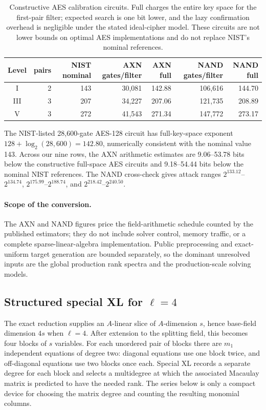 \documentclass[11pt]{article}
\newcommand{\LoneNANDRange}{$2^{133.12}$--$2^{134.74}$}
\newcommand{\LthreeNANDRange}{$2^{175.99}$--$2^{188.74}$}
\newcommand{\LfiveNANDRange}{$2^{218.42}$--$2^{240.50}$}
\newcommand{\AXNNominalHeadroomRange}{9.18--54.44}
\newcommand{\AXNFullAESGapRange}{9.06--53.78}
\begin{document}
\begin{table}[tbp]
\centering
\caption{Constructive AES calibration circuits.  Full charges the entire key
space for the first-pair filter; expected search is one bit lower, and the
lazy confirmation overhead is negligible under the stated ideal-cipher model.
These circuits are not lower bounds on optimal AES implementations and do not
replace NIST's nominal references.}
\label{tab:aes-calibration}
\scriptsize
\setlength{\tabcolsep}{3.5pt}
\begin{tabular}{@{}c r r r r r r@{}}
\toprule
Level & pairs & NIST nominal & AXN gates/filter & AXN full & NAND gates/filter & NAND full\\
\midrule
I   & 2 & 143 & 30,081 & 142.88 & 106,616 & 144.70\\
III & 3 & 207 & 34,227 & 207.06 & 121,735 & 208.89\\
V   & 3 & 272 & 41,543 & 271.34 & 147,772 & 273.17\\
\bottomrule
\end{tabular}
\end{table}

The NIST-listed 28,600-gate AES-128 circuit has full-key-space exponent
$128+\log_2(28{,}600)=142.80$, numerically consistent with the nominal value
143.  Across our nine rows, the AXN arithmetic estimates are
\AXNFullAESGapRange{} bits below the constructive full-space AES circuits and
\AXNNominalHeadroomRange{} bits below the nominal NIST references.  The NAND
cross-check gives attack ranges \LoneNANDRange, \LthreeNANDRange, and
\LfiveNANDRange.

\paragraph{Scope of the conversion.}
The AXN and NAND figures price the field-arithmetic schedule counted by the
published estimators; they do not include solver control, memory traffic, or a
complete sparse-linear-algebra implementation.  Public preprocessing and
exact-uniform target generation are bounded separately, so the dominant
unresolved inputs are the global production rank spectra and the
production-scale solving models.

\subsection{Structured special XL for \texorpdfstring{$\ell=4$}{l=4}}\label{sec:special-xl}

The exact reduction supplies an $A$-linear slice of $A$-dimension $s$,
hence base-field dimension $4s$ when $\ell=4$.  After extension to the
splitting field, this becomes four blocks of $s$ variables.  For each unordered pair of blocks there are $m_1$ independent equations
of degree two: diagonal equations use one block twice, and off-diagonal
equations use two blocks once each.  Special XL records a separate degree for
each block and selects a multidegree
at which the associated Macaulay matrix is predicted to have the needed rank.
The series below is only a compact device for choosing the matrix degree and
counting the resulting monomial columns.
\end{document}
